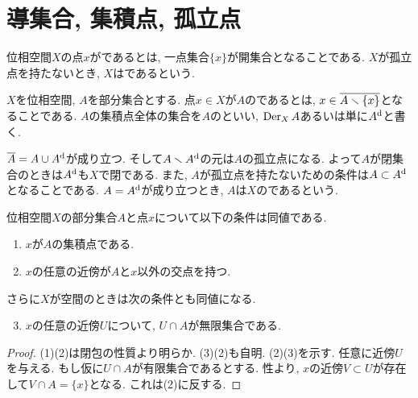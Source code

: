 \documentclass[uplatex, dvipdfmx, a4paper, 12pt, class=jsbook, crop=false]{standalone}
\begin{document}
\section{導集合, 集積点, 孤立点}
\label{sec:derived-sets}

\begin{definition}
	位相空間$ X $の点$ x $がであるとは, 一点集合$ \{x\} $が開集合となることである.
	$ X $が孤立点を持たないとき, $ X $はであるという.
\end{definition}

\begin{definition}
	$ X $を位相空間, $ A $を部分集合とする.
	点$ x \in X $が$ A $のであるとは, $ x \in \overline{A \smallsetminus \{x\}} $となることである.
	$ A $の集積点全体の集合を$ A $のといい, $ \mathop{\mathrm{Der}}\nolimits_X A $あるいは単に$ A^{\mathrm{d}} $と書く.
\end{definition}

$ \overline{A} = A \cup A^{\mathrm{d}} $が成り立つ.
そして$ A \smallsetminus A^{\mathrm{d}} $の元は$ A $の孤立点になる.
よって$ A $が閉集合のときは$ A^{\mathrm{d}} $も$ X $で閉である.
また, $ A $が孤立点を持たないための条件は$ A \subset A^{\mathrm{d}} $となることである.
$ A = A^{\mathrm{d}} $が成り立つとき, $ A $は$ X $のであるという.

\begin{proposition}
	位相空間$ X $の部分集合$ A $と点$ x $について以下の条件は同値である.
	\begin{enumerate}
		\item $ x $が$ A $の集積点である.
		\item $ x $の任意の近傍が$ A $と$ x $以外の交点を持つ.
	\end{enumerate}
	さらに$ X $が空間のときは次の条件とも同値になる.
	\begin{enumerate}
		\setcounter{enumi}{2}
	\item $ x $の任意の近傍$ U $について, $ U \cap A $が無限集合である.
\end{enumerate}
\end{proposition}
\begin{proof}
	(1)\lrimp(2)は閉包の性質より明らか.
	(3)\rimp(2)も自明.
	(2)\rimp(3)を示す.
	任意に近傍$ U $を与える.
	もし仮に$ U \cap A $が有限集合であるとする.
	性より, $ x $の近傍$ V \subset U $が存在して$ V \cap A = \{x\} $となる.
	これは(2)に反する.
\end{proof}
\end{document}
